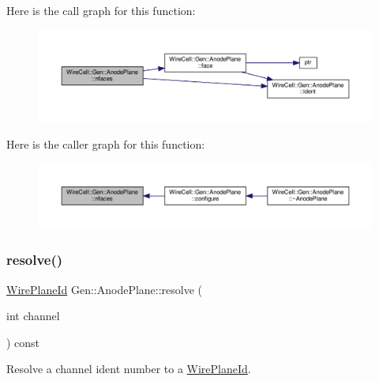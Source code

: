 Here is the call graph for this function\+:
\nopagebreak
\begin{figure}[H]
\begin{center}
\leavevmode
\includegraphics[width=350pt]{class_wire_cell_1_1_gen_1_1_anode_plane_a67547b54d01b3112b8a194660d1d2f2a_cgraph}
\end{center}
\end{figure}
Here is the caller graph for this function\+:
\nopagebreak
\begin{figure}[H]
\begin{center}
\leavevmode
\includegraphics[width=350pt]{class_wire_cell_1_1_gen_1_1_anode_plane_a67547b54d01b3112b8a194660d1d2f2a_icgraph}
\end{center}
\end{figure}
\mbox{\label{class_wire_cell_1_1_gen_1_1_anode_plane_abfe29b697f36910a6b7a08c9e4b984bd}} 
\subsubsection{\texorpdfstring{resolve()}{resolve()}}
{\footnotesize\ttfamily \hyperlink{class_wire_cell_1_1_wire_plane_id}{Wire\+Plane\+Id} Gen\+::\+Anode\+Plane\+::resolve (\begin{DoxyParamCaption}\item[{int}]{channel }\end{DoxyParamCaption}) const\hspace{0.3cm}{\ttfamily [virtual]}}



Resolve a channel ident number to a \hyperlink{class_wire_cell_1_1_wire_plane_id}{Wire\+Plane\+Id}. 



